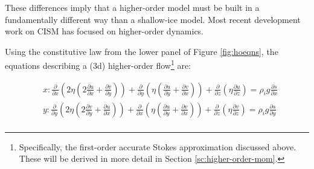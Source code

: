 These differences imply that a higher-order model must be built in a fundamentally different way than a shallow-ice model.
Most recent development work on CISM has focused on higher-order dynamics.

%
%
%

Using the constitutive law from the lower panel of Figure \ref{fig:hoeqns}, the equations describing a (3d) higher-order flow\footnote{Specifically, the first-order accurate Stokes approximation discussed above. These will be derived in more detail in Section \ref{sc:higher-order-mom}.} are:

\begin{equation}
  \begin{split}
  & x: \frac{\partial}{\partial x}\left ( 2 \eta  
\left(2\frac{\partial u}{\partial x}+\frac{\partial v}{\partial y}\right)\right)
+\frac{\partial}{\partial y}\left(\eta \left(
\frac{\partial u}{\partial y}+\frac{\partial v}{\partial x}\right)\right)
+\frac{\partial}{\partial z}\left(\eta \frac{\partial u}{\partial z}\right)
=\rho_i g \frac{\partial s}{\partial x} \\
  & y: \frac{\partial}{\partial y}\left ( 2 \eta 
\left(2\frac{\partial v}{\partial y}+\frac{\partial u}{\partial x}\right)\right)
+\frac{\partial}{\partial x}\left(\eta \left(
\frac{\partial u}{\partial y}+\frac{\partial v}{\partial x}\right)\right)
+\frac{\partial}{\partial z}\left(\eta \frac{\partial v}{\partial z}\right)
=\rho_i g \frac{\partial s}{\partial y} \\
  \end{split}
\end{equation}


